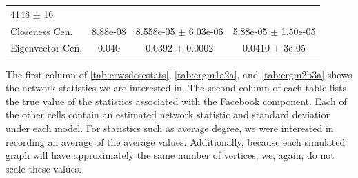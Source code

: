 \documentclass[12pt,twoside]{amherstthesis}
\begin{document}
\begin{longtable}[]{@{}lccc@{}}
\begin{minipage}[t]{0.29\columnwidth}
  4148 \(\pm\) 16\strut
  \end{minipage}\tabularnewline
  \begin{minipage}[t]{0.20\columnwidth}\raggedright\strut
  Closeness Cen.\strut
  \end{minipage} & \begin{minipage}[t]{0.12\columnwidth}\centering\strut
  8.88e-08\strut
  \end{minipage} & \begin{minipage}[t]{0.27\columnwidth}\centering\strut
  8.558e-05 \(\pm\) 6.03e-06\strut
  \end{minipage} & \begin{minipage}[t]{0.29\columnwidth}\centering\strut
  5.88e-05 \(\pm\) 1.50e-05\strut
  \end{minipage}\tabularnewline
  \begin{minipage}[t]{0.20\columnwidth}\raggedright\strut
  Eigenvector Cen.\strut
  \end{minipage} & \begin{minipage}[t]{0.12\columnwidth}\centering\strut
  0.040\strut
  \end{minipage} & \begin{minipage}[t]{0.27\columnwidth}\centering\strut
  0.0392 \(\pm\) 0.0002\strut
  \end{minipage} & \begin{minipage}[t]{0.29\columnwidth}\centering\strut
  0.0410 \(\pm\) 3e-05\strut
  \end{minipage}\tabularnewline
  \bottomrule
  \end{longtable}
  
  The first column of \autoref{tab:erwsdescstats}, \autoref{tab:ergm1a2a},
  and \autoref{tab:ergm2b3a} shows the network statistics we are
  interested in. The second column of each table lists the true value of
  the statistics associated with the Facebook component. Each of the other
  cells contain an estimated network statistic and standard deviation
  under each model. For statistics such as average degree, we were
  interested in recording an average of the average values. Additionally,
  because each simulated graph will have approximately the same number of
  vertices, we, again, do not scale these values.
  
\end{document}

